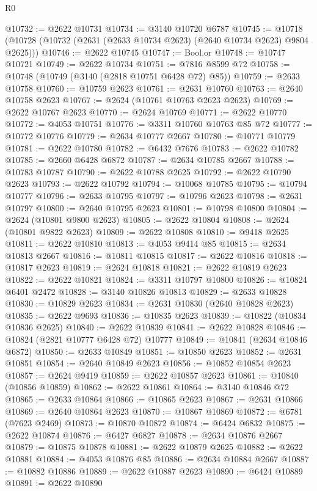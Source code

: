 \begin{lexlean}{R0}
\begin{coremodule}
@10732 := @2622 @10731
@10734 := @3140 @10720 @6787
@10745 := @10718 (@10728 (@10732 (@2631 (@2633 @10734 @2623) (@2640 @10734 @2623) @9804 @2625)))
@10746 := @2622 @10745
@10747 := Bool.or
@10748 := @10747 @10721
@10749 := @2622 @10734
@10751 := @7816 @8599 @72
@10758 := @10748 (@10749 (@3140 (@2818 @10751 @6428 @72) @85))
@10759 := @2633 @10758
@10760 := @10759 @2623
@10761 := @2631 @10760
@10763 := @2640 @10758 @2623
@10767 := @2624 (@10761 @10763 @2623 @2623)
@10769 := @2622 @10767 @2623
@10770 := @2624 @10769
@10771 := @2622 @10770
@10772 := @4053 @10751
@10776 := @3311 @10760 @10763 @85 @72
@10777 := @10772 @10776
@10779 := @2634 @10777 @2667
@10780 := @10771 @10779
@10781 := @2622 @10780
@10782 := @6432 @7676
@10783 := @2622 @10782
@10785 := @2660 @6428 @6872
@10787 := @2634 @10785 @2667
@10788 := @10783 @10787
@10790 := @2622 @10788 @2625
@10792 := @2622 @10790 @2623
@10793 := @2622 @10792
@10794 := @10068 @10785
@10795 := @10794 @10777
@10796 := @2633 @10795
@10797 := @10796 @2623
@10798 := @2631 @10797
@10800 := @2640 @10795 @2623
@10801 := @10798 @10800
@10804 := @2624 (@10801 @9800 @2623)
@10805 := @2622 @10804
@10808 := @2624 (@10801 @9822 @2623)
@10809 := @2622 @10808
@10810 := @9418 @2625
@10811 := @2622 @10810
@10813 := @4053 @9414 @85
@10815 := @2634 @10813 @2667
@10816 := @10811 @10815
@10817 := @2622 @10816
@10818 := @10817 @2623
@10819 := @2624 @10818
@10821 := @2622 @10819 @2623
@10822 := @2622 @10821
@10824 := @3311 @10797 @10800
@10826 := @10824 @6401 @2472
@10828 := @3140 @10826 @10813
@10829 := @2633 @10828
@10830 := @10829 @2623
@10834 := @2631 @10830 (@2640 @10828 @2623)
@10835 := @2622 @9693
@10836 := @10835 @2623
@10839 := @10822 (@10834 @10836 @2625)
@10840 := @2622 @10839
@10841 := @2622 @10828
@10846 := @10824 (@2821 @10777 @6428 @72) @10777
@10849 := @10841 (@2634 @10846 @6872)
@10850 := @2633 @10849
@10851 := @10850 @2623
@10852 := @2631 @10851
@10854 := @2640 @10849 @2623
@10856 := @10852 @10854 @2623
@10857 := @2624 @9419
@10859 := @2622 @10857 @2623
@10861 := @10840 (@10856 @10859)
@10862 := @2622 @10861
@10864 := @3140 @10846 @72
@10865 := @2633 @10864
@10866 := @10865 @2623
@10867 := @2631 @10866
@10869 := @2640 @10864 @2623
@10870 := @10867 @10869
@10872 := @6781 (@7623 @2469)
@10873 := @10870 @10872
@10874 := @6424 @6832
@10875 := @2622 @10874
@10876 := @6427 @6827
@10878 := @2634 @10876 @2667
@10879 := @10875 @10878
@10881 := @2622 @10879 @2625
@10882 := @2622 @10881
@10884 := @4053 @10876 @85
@10886 := @2634 @10884 @2667
@10887 := @10882 @10886
@10889 := @2622 @10887 @2623
@10890 := @6424 @10889
@10891 := @2622 @10890

\end{coremodule}
\end{lexlean}

